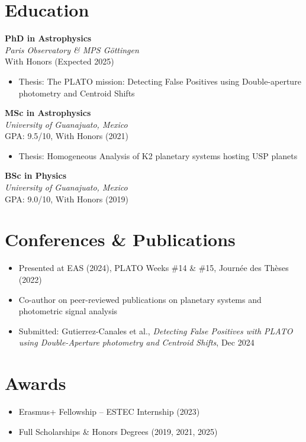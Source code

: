 \documentclass[10pt,a4paper]{article}
\begin{document}
\section*{Education}

\textbf{PhD in Astrophysics} \\
\textit{Paris Observatory \& MPS Göttingen} \\
With Honors (Expected 2025)
\begin{itemize}
	\item Thesis: The PLATO mission: Detecting False Positives using Double-aperture photometry and Centroid Shifts
\end{itemize}

\vspace{0.5em}

\textbf{MSc in Astrophysics} \\
\textit{University of Guanajuato, Mexico} \\
GPA: 9.5/10, With Honors (2021)

\begin{itemize}[leftmargin=1.5em]
    \item Thesis: Homogeneous Analysis of K2 planetary systems hosting USP planets
\end{itemize}

\textbf{BSc in Physics} \\
\textit{University of Guanajuato, Mexico} \\
GPA: 9.0/10, With Honors (2019)

\section*{Conferences \& Publications}
\begin{itemize}[leftmargin=1.5em]
    \item Presented at EAS (2024), PLATO Weeks \#14 \& \#15, Journée des Thèses (2022)
    \item Co-author on peer-reviewed publications on planetary systems and photometric signal analysis
    \item Submitted: Gutierrez-Canales et al., \textit{Detecting False Positives with PLATO using Double-Aperture photometry and Centroid Shifts}, Dec 2024
\end{itemize}

\section*{Awards}
\begin{itemize}[leftmargin=1.5em]
    \item Erasmus+ Fellowship -- ESTEC Internship (2023)
    \item Full Scholarships \& Honors Degrees (2019, 2021, 2025)
\end{itemize}
\end{document}
